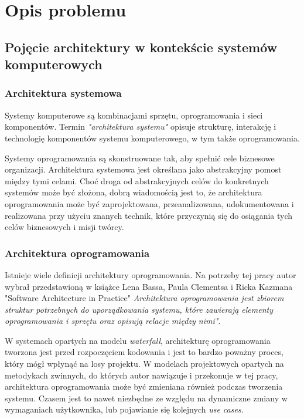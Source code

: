 \chapter{Opis problemu}

\section{Pojęcie architektury w kontekście systemów komputerowych}
\subsection{Architektura systemowa}
Systemy komputerowe są kombinacjami sprzętu, oprogramowania i sieci komponentów. Termin \textit{"architektura systemu"} opisuje strukturę, interakcję i technologię komponentów systemu komputerowego, w tym także oprogramowania.

Systemy oprogramowania są skonstruowane tak, aby spełnić cele biznesowe organizacji. Architektura systemowa jest określana jako abstrakcyjny pomost między tymi celami. Choć droga od abstrakcyjnych celów do konkretnych systemów może być złożona, dobrą wiadomością jest to, że architektura oprogramowania może być zaprojektowana, przeanalizowana, udokumentowana i realizowana przy użyciu znanych technik, które przyczynią się do osiągania tych celów biznesowych i misji twórcy. 


\subsection{Architektura oprogramowania}
Istnieje wiele definicji architektury oprogramowania. Na potrzeby tej pracy autor wybrał przedstawioną w książce Lena Bassa, Paula Clementsa i Ricka Kazmana "Software Architecture in Practice"\cite{bib:architect:software} \textit{Architektura oprogramowania jest zbiorem struktur potrzebnych do uporządkowania systemu, które zawierają elementy oprogramowania i sprzętu oraz opisują relacje między nimi"}. 

W systemach opartych na modelu \textit{waterfall}, architekturę oprogramowania tworzona jest przed rozpoczęciem kodowania i jest to bardzo poważny proces, który mógł wpłynąć na losy projektu. W modelach projektowych opartych na metodykach zwinnych, do których autor nawiązuje i przekonuje w tej pracy, architektura oprogramowania może być zmieniana również podczas tworzenia systemu. Czasem jest to nawet niezbędne ze względu na dynamiczne zmiany w wymaganiach użytkownika, lub pojawianie się kolejnych \textit{use cases}.

